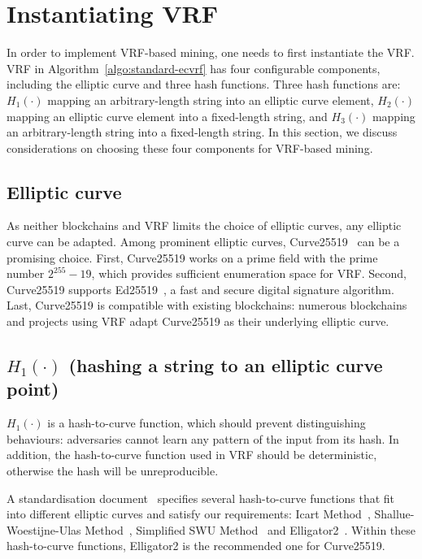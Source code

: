 \section{Instantiating VRF}

In order to implement VRF-based mining, one needs to first instantiate the VRF.
VRF in Algorithm~\ref{algo:standard-ecvrf} has four configurable components, including the elliptic curve and three hash functions.
Three hash functions are:
$H_{1}(\cdot)$ mapping an arbitrary-length string into an elliptic curve element,
$H_{2}(\cdot)$ mapping an elliptic curve element into a fixed-length string, and
$H_{3}(\cdot)$ mapping an arbitrary-length string into a fixed-length string.
In this section, we discuss considerations on choosing these four components for VRF-based mining.





\subsection{Elliptic curve}

As neither blockchains and VRF limits the choice of elliptic curves, any elliptic curve can be adapted.
Among prominent elliptic curves, Curve25519~\cite{bernstein2006curve25519} can be a promising choice.
First, Curve25519 works on a prime field with the prime number $2^{255} - 19$, which provides sufficient enumeration space for VRF.
Second, Curve25519 supports Ed25519~\cite{bernstein2012high}, a fast and secure digital signature algorithm.
Last, Curve25519 is compatible with existing blockchains: numerous blockchains and projects using VRF adapt Curve25519 as their underlying elliptic curve.




\subsection{$H_{1}(\cdot)$ (hashing a string to an elliptic curve point)}

$H_{1}(\cdot)$ is a hash-to-curve function, which should prevent distinguishing behaviours: adversaries cannot learn any pattern of the input from its hash.
In addition, the hash-to-curve function used in VRF should be deterministic, otherwise the hash will be unreproducible.

A standardisation document~\cite{scott2019hashing} specifies several hash-to-curve functions that fit into different elliptic curves and satisfy our requirements: Icart Method~\cite{icart2009hash}, Shallue-Woestijne-Ulas Method~\cite{ulas2007rational}, Simplified SWU Method~\cite{brier2010efficient} and Elligator2~\cite{bernstein2013elligator}.
Within these hash-to-curve functions, Elligator2 is the recommended one for Curve25519.




